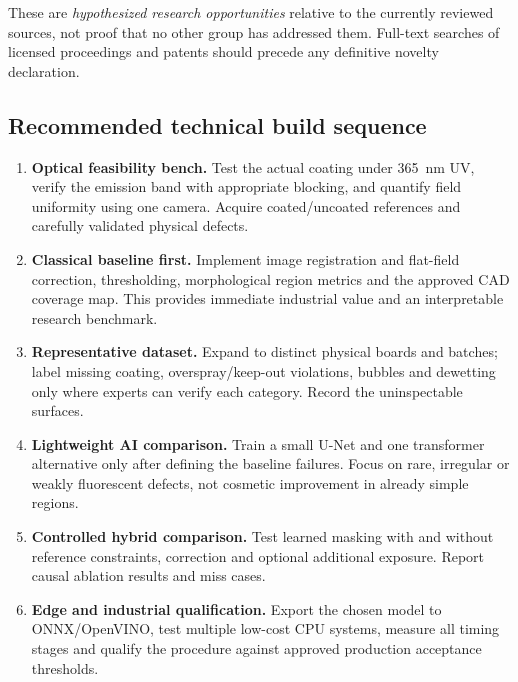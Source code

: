 These are \emph{hypothesized research opportunities} relative to the currently reviewed sources, not proof that no other group has addressed them. Full-text searches of licensed proceedings and patents should precede any definitive novelty declaration.

\subsection{Recommended technical build sequence}
\begin{enumerate}[leftmargin=*]
\item \textbf{Optical feasibility bench.} Test the actual coating under 365~nm UV, verify the emission band with appropriate blocking, and quantify field uniformity using one camera. Acquire coated/uncoated references and carefully validated physical defects.
\item \textbf{Classical baseline first.} Implement image registration and flat-field correction, thresholding, morphological region metrics and the approved CAD coverage map. This provides immediate industrial value and an interpretable research benchmark.
\item \textbf{Representative dataset.} Expand to distinct physical boards and batches; label missing coating, overspray/keep-out violations, bubbles and dewetting only where experts can verify each category. Record the uninspectable surfaces.
\item \textbf{Lightweight AI comparison.} Train a small U-Net and one transformer alternative only after defining the baseline failures. Focus on rare, irregular or weakly fluorescent defects, not cosmetic improvement in already simple regions.
\item \textbf{Controlled hybrid comparison.} Test learned masking with and without reference constraints, correction and optional additional exposure. Report causal ablation results and miss cases.
\item \textbf{Edge and industrial qualification.} Export the chosen model to ONNX/OpenVINO, test multiple low-cost CPU systems, measure all timing stages and qualify the procedure against approved production acceptance thresholds.
\end{enumerate}

